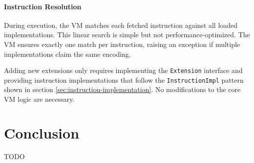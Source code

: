 \documentclass[sigconf]{acmart}
\begin{document}
\paragraph{Instruction Resolution}
During execution, the VM matches each fetched instruction against all loaded implementations. This linear search is simple but not performance-optimized. The VM ensures exactly one match per instruction, raising an exception if multiple implementations claim the same encoding.

Adding new extensions only requires implementing the \texttt{Extension} interface and providing instruction implementations that follow the \texttt{InstructionImpl} pattern shown in section \ref{sec:instruction-implementation}. No modifications to the core VM logic are necessary. 

\section{Conclusion}
TODO



\end{document}
